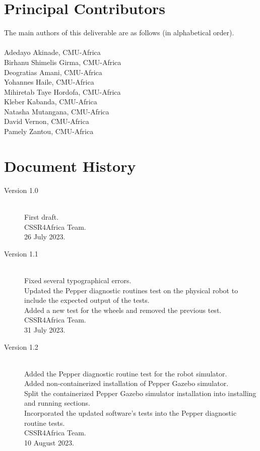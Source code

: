 \documentclass{CSSRforAfrica}
\newcommand{\blank}{~\\}
\begin{document}
{\section*{Principal Contributors}
\label{contributors}
The main authors of this deliverable are as follows (in alphabetical order).
\blank
~
\blank
Adedayo Akinade, CMU-Africa\\ 
Birhanu Shimelis Girma, CMU-Africa\\         %
Deogratias Amani, CMU-Africa\\  
Yohannes Haile, CMU-Africa\\ 
Mihiretab Taye Hordofa, CMU-Africa\\ 
Kleber Kabanda, CMU-Africa\\
Natasha Mutangana, CMU-Africa\\ 
David Vernon, CMU-Africa\\
Pamely Zantou, CMU-Africa\\ 

\pagebreak
\section*{Document History}
\label{document_history}

\begin{description}

\item [Version 1.0]~\\
First draft. \\
CSSR4Africa Team. \\ %
26 July 2023. %

\item [Version 1.1]~\\
Fixed several typographical errors.\\
Updated the Pepper diagnostic routines test on the physical robot to include the expected output of the tests.\\
Added a new test for the wheels and removed the previous test.\\
CSSR4Africa Team.\\
31 July 2023.

\item [Version 1.2]~\\
Added the Pepper diagnostic routine test for the robot simulator.\\
Added non-containerized installation of Pepper Gazebo simulator.\\
Split the containerized Pepper Gazebo simulator installation into installing and running sections.\\
Incorporated the updated software's tests into the Pepper diagnostic routine tests.\\
CSSR4Africa Team.\\
10 August 2023.


\end{description}}
\end{document}
